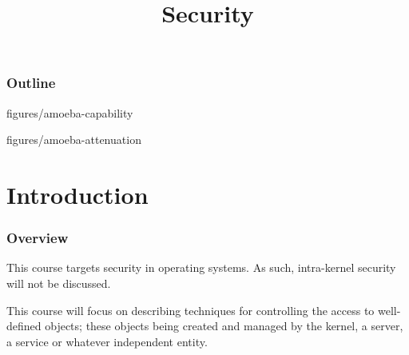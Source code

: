 %
%
%
%
%
%

%
%

%
%

\def\path{../../../..}

%
%



%
%

\title{Security}

%
%



%
%

\begin{frame}
  \titlepage
\end{frame}

%
%

\begin{frame}
  \frametitle{Outline}

  \tableofcontents
\end{frame}

%
%

                {figures/amoeba-capability}

                {figures/amoeba-attenuation}

%
%

%
%

\section{Introduction}


\begin{frame}
  \frametitle{Overview}

  This course targets security in operating systems. As such, intra-kernel
  security will not be discussed.

  \-

  This course will focus on describing techniques for controlling the access to
  well-defined objects; these objects being created and managed by the kernel,
  a server, a service or whatever independent entity.
\end{frame}


